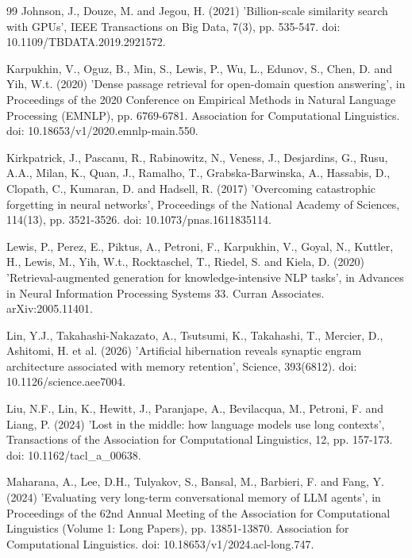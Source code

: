 \documentclass[10pt,a4paper,twocolumn]{article}
\begin{document}
\begin{thebibliography}{99}
Johnson, J., Douze, M. and Jegou, H. (2021) 'Billion-scale similarity search with GPUs', IEEE Transactions on Big Data, 7(3), pp. 535-547. doi: 10.1109/TBDATA.2019.2921572.

Karpukhin, V., Oguz, B., Min, S., Lewis, P., Wu, L., Edunov, S., Chen, D. and Yih, W.t. (2020) 'Dense passage retrieval for open-domain question answering', in Proceedings of the 2020 Conference on Empirical Methods in Natural Language Processing (EMNLP), pp. 6769-6781. Association for Computational Linguistics. doi: 10.18653/v1/2020.emnlp-main.550.

Kirkpatrick, J., Pascanu, R., Rabinowitz, N., Veness, J., Desjardins, G., Rusu, A.A., Milan, K., Quan, J., Ramalho, T., Grabska-Barwinska, A., Hassabis, D., Clopath, C., Kumaran, D. and Hadsell, R. (2017) 'Overcoming catastrophic forgetting in neural networks', Proceedings of the National Academy of Sciences, 114(13), pp. 3521-3526. doi: 10.1073/pnas.1611835114.

Lewis, P., Perez, E., Piktus, A., Petroni, F., Karpukhin, V., Goyal, N., Kuttler, H., Lewis, M., Yih, W.t., Rocktaschel, T., Riedel, S. and Kiela, D. (2020) 'Retrieval-augmented generation for knowledge-intensive NLP tasks', in Advances in Neural Information Processing Systems 33. Curran Associates. arXiv:2005.11401.

Lin, Y.J., Takahashi-Nakazato, A., Tsutsumi, K., Takahashi, T., Mercier, D., Ashitomi, H. et al. (2026) 'Artificial hibernation reveals synaptic engram architecture associated with memory retention', Science, 393(6812). doi: 10.1126/science.aee7004.

Liu, N.F., Lin, K., Hewitt, J., Paranjape, A., Bevilacqua, M., Petroni, F. and Liang, P. (2024) 'Lost in the middle: how language models use long contexts', Transactions of the Association for Computational Linguistics, 12, pp. 157-173. doi: 10.1162/tacl\_a\_00638.

Maharana, A., Lee, D.H., Tulyakov, S., Bansal, M., Barbieri, F. and Fang, Y. (2024) 'Evaluating very long-term conversational memory of LLM agents', in Proceedings of the 62nd Annual Meeting of the Association for Computational Linguistics (Volume 1: Long Papers), pp. 13851-13870. Association for Computational Linguistics. doi: 10.18653/v1/2024.acl-long.747.


\end{thebibliography}
\end{document}
